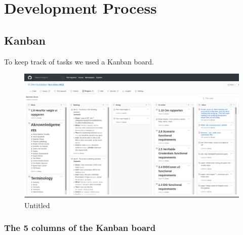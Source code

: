 \hypertarget{development-process}{%
\chapter{Development Process}\label{development-process}}

\hypertarget{kanban}{%
\section{Kanban}\label{kanban}}

To keep track of tasks we used a Kanban board.

\begin{figure}
\centering
\includegraphics{chapters/Development Process a132dd5987b94adf8fc5989add9afc3f/Untitled.png}
\caption{Untitled}
\end{figure}

\hypertarget{the-5-columns-of-the-kanban-board}{%
\subsection{The 5 columns of the Kanban
board}\label{the-5-columns-of-the-kanban-board}}

